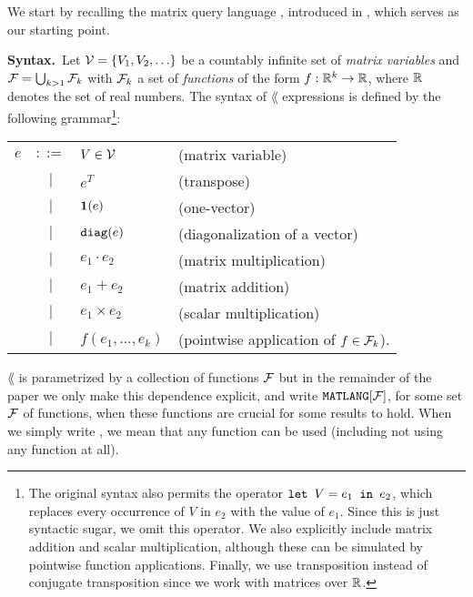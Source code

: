 
We start by recalling the matrix query language \lang, introduced in \cite{matlang-journal}, which serves as our starting point.

\smallskip
\noindent
\textbf{Syntax.}\,  Let $\mathcal{V} = \{V_1, V_2, \ldots\}$ be a countably infinite set of \textit{matrix variables} and $\mathcal{F}=\bigcup_{k>1}\mathcal{F}_k$ with
$\mathcal{F}_k$ a set of \textit{functions} of the  form $f:\mathbb{R}^k \to \mathbb{R}$, where $\mathbb{R}$ denotes the set of real numbers. The syntax of $\lang$ expressions is defined by the following grammar\footnote{The original syntax also permits the operator $\texttt{let } V = e_1 \texttt{ in } e_2$, which replaces every occurrence of $V$ in $e_2$ with the value of $e_1$. Since this is just syntactic sugar, we omit this operator. We also explicitly include matrix addition and scalar multiplication, although these can be simulated by pointwise function applications. Finally, we use transposition instead of conjugate transposition since we work with matrices over $\mathbb{R}$.}:


\begin{tabular}{lcll}
$e$ & $::=$ & $V\in \mathcal{V}$ & (matrix variable)\\
 & $|$ & $e^T$ & (transpose)\\ 
 & $|$ & $\mathbf{1}(e)$ & (one-vector)\\ 
 & $|$ & $\texttt{diag}(e)$ & (diagonalization of a vector)\\  
 & $|$ & $e_1 \cdot e_2$ & (matrix multiplication)\\   
 & $|$ & $e_1 + e_2$ & (matrix addition)\\   
 & $|$ & $e_1\times e_2$ & (scalar multiplication)\\
 & $|$ & $f(e_1,\ldots ,e_k)$ & (pointwise application of $f\in\mathcal{F}_k$).    
\end{tabular}
\vspace{1ex}


$\lang$ is parametrized by a collection of functions $\mathcal{F}$ but in the remainder of the paper we only make this dependence explicit, and write $\texttt{MATLANG}[\mathcal{F}]$, for some set $\mathcal{F}$ of functions, when these functions are crucial for some results to hold. When we simply write \lang, we mean that any function can be used (including not using any function at all).



